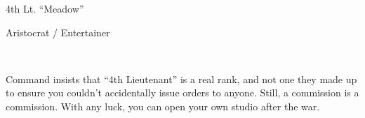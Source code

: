 \documentclass{article}
\newcommand{\Bra}{2}
\newcommand{\Agi}{3}
\newcommand{\Int}{2}
\newcommand{\Cun}{3}
\newcommand{\Wil}{2}
\newcommand{\Pre}{3}
\begin{document}
\begin{minipage}{0.6\linewidth}
{\Huge 4th Lt. ``Meadow'' }

    {\large Aristocrat / Entertainer }

\vspace{1.5em}

\end{minipage}\hfill%
\\

\vspace{0em}\raggedright


Command insists that ``4th Lieutenant'' is a real rank, and not one they made up to ensure you couldn't accidentally issue orders to anyone.  Still, a commission is a commission.  With any luck, you can open your own studio after the war.



\begin{center}
\Characteristics{\Bra}{\Agi}{\Int}{\Cun}{\Wil}{\Pre}

\noindent\null\hfill{}\quad
{}\null\quad
{}\quad
{}\hfill\null
{}\quad
\end{center}


\vspace{0.5em}



\vspace{-3em}
\end{document}
